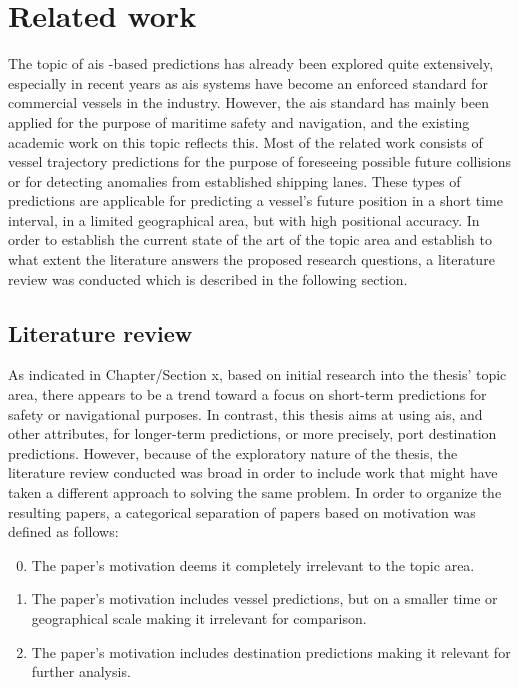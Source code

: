 \chapter{Related work}
\label{chap:related_work}

The topic of \acrfull{ais} -based predictions has already been explored quite extensively, especially in recent years as \acrshort{ais} systems have become an enforced standard for commercial vessels in the industry. However, the \acrshort{ais} standard has mainly been applied for the purpose of maritime safety and navigation, and the existing academic work on this topic reflects this. Most of the related work consists of vessel trajectory predictions for the purpose of foreseeing possible future collisions or for detecting anomalies from established shipping lanes. These types of predictions are applicable for predicting a vessel's future position in a short time interval, in a limited geographical area, but with high positional accuracy. In order to establish the current state of the art of the topic area and establish to what extent the literature answers the proposed research questions, a literature review was conducted which is described in the following section.

\section{Literature review}
\label{sec:lit_review}

As indicated in Chapter/Section x, based on initial research into the thesis' topic area, there appears to be a trend toward a focus on short-term predictions for safety or navigational purposes. In contrast, this thesis aims at using \acrshort{ais}, and other attributes, for longer-term predictions, or more precisely, port destination predictions. However, because of the exploratory nature of the thesis, the literature review conducted was broad in order to include work that might have taken a different approach to solving the same problem. In order to organize the resulting papers, a categorical separation of papers based on motivation was defined as follows:

\begin{enumerate}
\setcounter{enumi}{-1}
    \item The paper's motivation deems it completely irrelevant to the topic area.
    \item The paper's motivation includes vessel predictions, but on a smaller time or geographical scale making it irrelevant for comparison.
    \item The paper's motivation includes destination predictions making it relevant for further analysis.
\end{enumerate}

